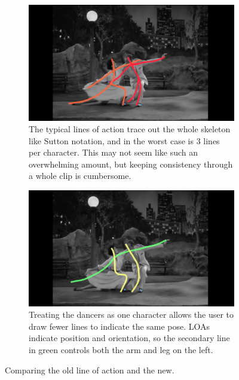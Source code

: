 \begin{figure}[h!]
	\centering
        \begin{subfigure}[b!]{0.45\textwidth}
        	\centering
                \includegraphics[width=\linewidth]{img/keyframe_case_7_baseline}
                \caption{The typical lines of action trace out the whole skeleton like Sutton notation, and in the worst case is 3 lines per character. This may not seem like such an overwhelming amount, but keeping consistency through a whole clip is cumbersome.}
                \label{fig:baseline}
        \end{subfigure}
        \quad
        \begin{subfigure}[b!]{0.45\textwidth}
        	\centering
                \includegraphics[width=\linewidth]{img/keyframe_case_7_new}
                \caption{Treating the dancers as one character allows the user to draw fewer lines to indicate the same pose. LOAs indicate position and orientation, so the secondary line in green controls both the arm and leg on the left.}
                \label{fig:new_notation}
        \end{subfigure}%
        \caption{Comparing the old line of action and the new.}
	\label{fig:poses}
\end{figure}

